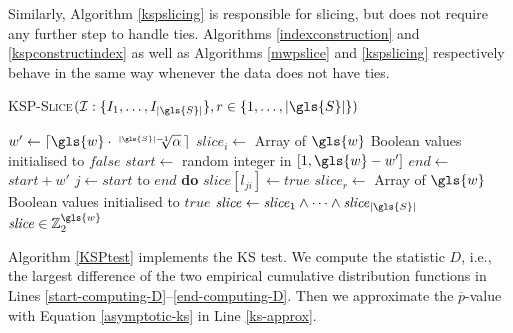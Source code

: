 Similarly, Algorithm \ref{kspslicing} is responsible for slicing, but does not require any further step to handle ties. Algorithms \ref{indexconstruction} and \ref{kspconstructindex} as well as Algorithms \ref{mwpslice} and \ref{kspslicing} respectively behave in the same way whenever the data does not have ties. 

\begin{algorithm}\footnotesize
	\caption{\textsc{\gls{KSP}-Slice}{$(\mathcal{I}: \{I_1, \dots, I_{|\gls{S}|} \}, r \in \{1, \dots, |\gls{S}|\})$}}\label{kspslicing}
	\begin{algorithmic}[1]
		\State $w' \gets \left \lceil \gls{w} \cdot \sqrt[|\gls{S}|-1]{\alpha}\,  \right \rceil  $
		\State $\mathit{slice}_i \gets$ Array of $\gls{w}$ Boolean values initialised to $\mathit{false}$
		\State $\mathit{start} \gets$ random integer in $[1,\gls{w}-w']$
		\State $\mathit{end} \gets$ $\mathit{start} + w'$
		 $j \gets \mathit{start}$ to $\mathit{end}$  {\bfseries do} $\mathit{slice}[l_{ji}] \gets \mathit{true}$
		\EndFor
		\State $\mathit{slice}_r \gets$ Array of $\gls{w}$ Boolean values initialised to $\mathit{true}$
		\State $\mathit{slice} \gets \mathit{slice}_1 \wedge \dots \wedge \mathit{slice}_{|\gls{S}|}$
		 $\mathit{slice} \in \mathbb{Z}_2^{\gls{w}}$
	\end{algorithmic}
\end{algorithm}

Algorithm \ref{KSPtest} implements the KS test. We compute the statistic $D$, i.e., the largest difference of the two empirical cumulative distribution functions in Lines \ref{start-computing-D}--\ref{end-computing-D}. 
Then we approximate the $\overline{p}$-value with Equation \ref{asymptotic-ks} in Line \ref{ks-approx}. 


